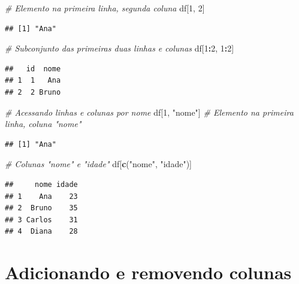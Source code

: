 \documentclass[
]{book}
\newenvironment{Shaded}{\begin{snugshade}}{\end{snugshade}}
\newcommand{\CommentTok}[1]{\textcolor[rgb]{0.56,0.35,0.01}{\textit{#1}}}
\newcommand{\DecValTok}[1]{\textcolor[rgb]{0.00,0.00,0.81}{#1}}
\newcommand{\FunctionTok}[1]{\textcolor[rgb]{0.13,0.29,0.53}{\textbf{#1}}}
\newcommand{\NormalTok}[1]{#1}
\newcommand{\SpecialCharTok}[1]{\textcolor[rgb]{0.81,0.36,0.00}{\textbf{#1}}}
\newcommand{\StringTok}[1]{\textcolor[rgb]{0.31,0.60,0.02}{#1}}
\theoremstyle{definition}
\theoremstyle{definition}
\theoremstyle{definition}
\theoremstyle{definition}
\theoremstyle{remark}
\begin{document}
\begin{Shaded}
\begin{Highlighting}[]
\CommentTok{\# Elemento na primeira linha, segunda coluna}
\NormalTok{df[}\DecValTok{1}\NormalTok{, }\DecValTok{2}\NormalTok{] }
\end{Highlighting}
\end{Shaded}

\begin{verbatim}
## [1] "Ana"
\end{verbatim}

\begin{Shaded}
\begin{Highlighting}[]
\CommentTok{\# Subconjunto das primeiras duas linhas e colunas}
\NormalTok{df[}\DecValTok{1}\SpecialCharTok{:}\DecValTok{2}\NormalTok{, }\DecValTok{1}\SpecialCharTok{:}\DecValTok{2}\NormalTok{] }
\end{Highlighting}
\end{Shaded}

\begin{verbatim}
##   id  nome
## 1  1   Ana
## 2  2 Bruno
\end{verbatim}

\begin{Shaded}
\begin{Highlighting}[]
\CommentTok{\# Acessando linhas e colunas por nome}
\NormalTok{df[}\DecValTok{1}\NormalTok{, }\StringTok{"nome"}\NormalTok{] }\CommentTok{\# Elemento na primeira linha, coluna "nome"}
\end{Highlighting}
\end{Shaded}

\begin{verbatim}
## [1] "Ana"
\end{verbatim}

\begin{Shaded}
\begin{Highlighting}[]
\CommentTok{\# Colunas "nome" e "idade"}
\NormalTok{df[}\FunctionTok{c}\NormalTok{(}\StringTok{"nome"}\NormalTok{, }\StringTok{"idade"}\NormalTok{)] }
\end{Highlighting}
\end{Shaded}

\begin{verbatim}
##     nome idade
## 1    Ana    23
## 2  Bruno    35
## 3 Carlos    31
## 4  Diana    28
\end{verbatim}

\section{Adicionando e removendo colunas}\label{adicionando-e-removendo-colunas}
\end{document}
